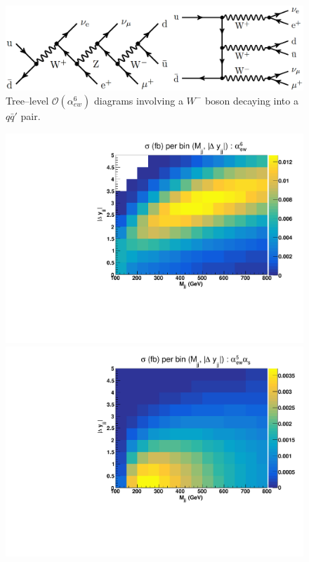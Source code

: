 \begin{figure}[hbt]
\centering %
\includegraphics[scale=0.19]{figures/scanfigures/jjpeak_diag.png}
\caption{Tree--level $\mathcal{O}(\alpha_{ew}^6)$ diagrams involving a $W^-$ boson decaying into a $q\bar{q}'$ pair.} \label{fig:jjpeak_diag}
\end{figure}


\begin{figure}[ht]
\centering
\includegraphics[scale=0.395]{figures/scanfigures/scan_ew6.pdf}
\includegraphics[scale=0.395]{figures/scanfigures/scan_ew5qcd1.pdf}

\end{figure}
